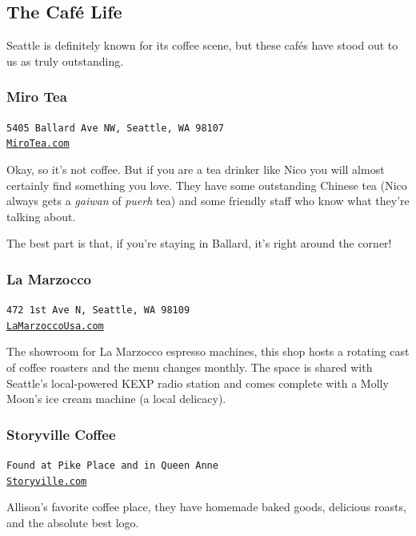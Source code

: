 \documentclass[10pt]{article}
\begin{document}
\newpage
\noindent\hrulefill
\subsection{The Caf\'e Life}
\label{subsec-cafe}
Seattle is definitely known for its coffee scene, but these caf\'es have stood out to us as truly outstanding.
\subsubsection{Miro Tea}
\begin{center}
    \texttt{5405 Ballard Ave NW, Seattle, WA 98107\\\href{http://mirotea.com/}{MiroTea.com}}
\end{center}

Okay, so it's not coffee. But if you are a tea drinker like Nico you will almost certainly
find something you love. They have some outstanding Chinese tea (Nico always gets a \textit{gaiwan} of \textit{puerh} tea)
and some friendly staff who know what they're talking about.

The best part is that, if you're staying in Ballard, it's right around the corner!

\subsubsection{La Marzocco}
\begin{center}
    \texttt{472 1st Ave N, Seattle, WA 98109 \\\href{https://lamarzoccousa.com}{LaMarzoccoUsa.com}}
\end{center}
The showroom for La Marzocco espresso machines, this shop hosts a rotating cast of coffee roasters and 
the menu changes monthly. The space is shared with Seattle's local-powered KEXP radio station and comes 
complete with a Molly Moon's ice cream machine (a local delicacy). 

\subsubsection{Storyville Coffee}
\begin{center}
    \texttt{Found at Pike Place and in Queen Anne\\\href{https://storyville.com/}{Storyville.com}}
\end{center}
Allison's favorite coffee place, they have homemade baked goods, delicious roasts, and the absolute best logo.
\end{document}
